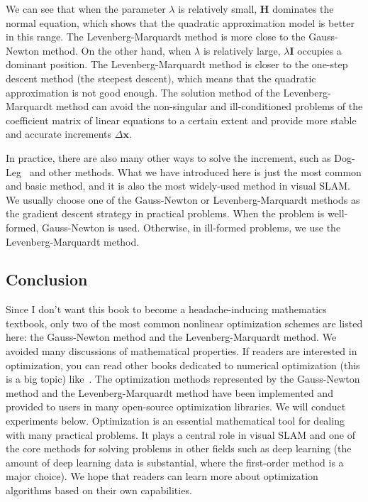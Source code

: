 We can see that when the parameter $\lambda$ is relatively small, $\mathbf{H}$ dominates the normal equation, which shows that the quadratic approximation model is better in this range. The Levenberg-Marquardt method is more close to the Gauss-Newton method. On the other hand, when $\lambda$ is relatively large, $\lambda \mathbf{I}$ occupies a dominant position. The Levenberg-Marquardt method is closer to the one-step descent method (the steepest descent), which means that the quadratic approximation is not good enough. The solution method of the Levenberg-Marquardt method can avoid the non-singular and ill-conditioned problems of the coefficient matrix of linear equations to a certain extent and provide more stable and accurate increments $\Delta \mathbf{x} $.

In practice, there are also many other ways to solve the increment, such as Dog-Leg~\cite{Nocedal2006} and other methods. What we have introduced here is just the most common and basic method, and it is also the most widely-used method in visual SLAM. We usually choose one of the Gauss-Newton or Levenberg-Marquardt methods as the gradient descent strategy in practical problems. When the problem is well-formed, Gauss-Newton is used. Otherwise, in ill-formed problems, we use the Levenberg-Marquardt method.

\subsection{Conclusion}
Since I don't want this book to become a headache-inducing mathematics textbook, only two of the most common nonlinear optimization schemes are listed here: the Gauss-Newton method and the Levenberg-Marquardt method. We avoided many discussions of mathematical properties. If readers are interested in optimization, you can read other books dedicated to numerical optimization (this is a big topic) like~\cite{Nocedal2006}. The optimization methods represented by the Gauss-Newton method and the Levenberg-Marquardt method have been implemented and provided to users in many open-source optimization libraries. We will conduct experiments below. Optimization is an essential mathematical tool for dealing with many practical problems. It plays a central role in visual SLAM and one of the core methods for solving problems in other fields such as deep learning (the amount of deep learning data is substantial, where the first-order method is a major choice). We hope that readers can learn more about optimization algorithms based on their own capabilities.

